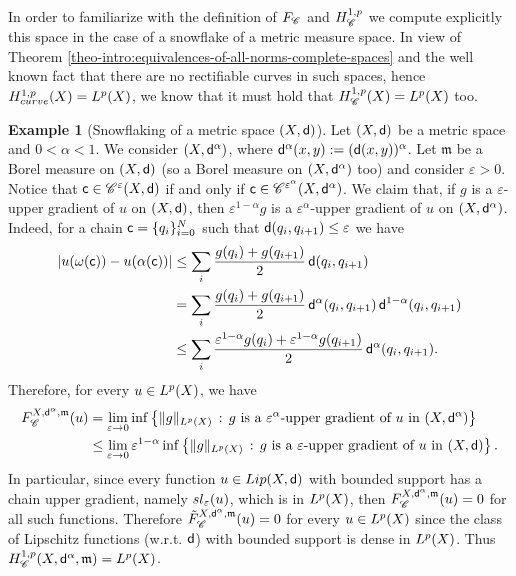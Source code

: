 \documentclass[12pt]{amsart}
\newcommand{\sfd}{{\sf d}}
\newcommand{\X}{{\rm X}}
\newcommand{\Lip}{{\rm Lip}}
\newcommand{\mm}{\mathfrak m}
\newcommand{\F}{{\rm F}}
\theoremstyle{definition}
\newtheorem{example}[theorem]{Example}
\newcommand{\sfc}{{\sf c}}
\newcommand{\Chain}[1]{\mathscr{C}^{#1}}
\renewcommand{\sl}[1]{{\rm sl}_{#1}}
\newcommand{\HH}[2]{H^{1,#1}_{{\rm #2}}}
\renewcommand{\F}[1]{{\rm F}_{{\rm #1}}}
\newcommand{\relF}[1]{\tilde{\rm F}_{{\rm #1}}}
\begin{document}
In order to familiarize with the definition of $\F{\Chain{}}$ and $\HH{p}{\Chain{}}$ we compute explicitly this space in the case of a snowflake of a metric measure space. In view of Theorem \ref{theo-intro:equivalences-of-all-norms-complete-spaces} and the well known fact that there are no rectifiable curves in such spaces, hence $\HH{p}{curve}(\X) = L^p(\X)$, we know that it must hold that $\HH{p}{\Chain{}}(\X) = L^p(\X)$ too.
%
\begin{example}[{Snowflaking of a metric space $(\X,\sfd)$}]
\label{rem:snowflake}
    Let $(\X,\sfd)$ be a metric space and $0<\alpha<1$. We consider $(\X,\sfd^\alpha)$, where $\sfd^\alpha(x,y):=(\sfd(x,y))^\alpha$. Let $\mm$ be a Borel measure on $(\X,\sfd)$ (so a Borel measure on $(\X,\sfd^\alpha)$ too)
    and consider $\varepsilon >0$. Notice that $\sfc \in \Chain{\varepsilon}(\X,\sfd)$ if and only if $\sfc \in \Chain{\varepsilon^\alpha}(\X,\sfd^\alpha)$. 
    We claim that, if $g$ is a $\varepsilon$-upper gradient of $u$ on $(\X,\sfd)$, then $\varepsilon^{1-\alpha} g$ is a $\varepsilon^\alpha$-upper gradient of $u$ on $(\X,\sfd^\alpha)$.
    Indeed, for a chain $\sfc=\{ q_i\}_{i=0}^N$ such that $\sfd(q_i,q_{i+1})\le \varepsilon$ we have 
    \begin{align}
        |u(\omega(\sfc))-u(\alpha(\sfc))| & \le \sum_i \frac{g(q_i) + g(q_{i+1})}{2}\,\sfd(q_i,q_{i+1}) \\
        & = \sum_i \frac{g(q_i) + g(q_{i+1})}{2}\,\sfd^\alpha(q_i,q_{i+1})\,\sfd^{1-\alpha}(q_i,q_{i+1}) \\
        &\le \sum_i \frac{\varepsilon^{1-\alpha}g(q_i) + \varepsilon^{1-\alpha}g(q_{i+1})}{2}\,\sfd^\alpha(q_i,q_{i+1}).
    \end{align}
    Therefore, for every $u\in L^p(\X)$, we have
    \begin{equation}
        \begin{aligned}
            \F{\Chain{}}^{\X,\sfd^\alpha,\mm}(u) &= \lim_{\varepsilon \to 0} \inf\left\{ \Vert g \Vert_{L^p(\X)}\,:\, g \text{ is a } \varepsilon^\alpha\text{-upper gradient of } u  \text{ in } (\X,\sfd^\alpha)  \right\} \\
            &\le \lim_{\varepsilon \to 0} \varepsilon^{1-\alpha}\inf\left\{ \Vert g \Vert_{L^p(\X)}\,:\, g \text{ is a } \varepsilon\text{-upper gradient of } u  \text{ in } (\X,\sfd)  \right\}.
        \end{aligned}
    \end{equation}
    In particular, since every function $u\in \Lip(\X,\sfd)$ with bounded support has a chain upper gradient, namely $\sl{\varepsilon}(u)$, which is in $L^p(\X)$, then $\F{\Chain{}}^{\X,\sfd^\alpha,\mm}(u)= 0$ for all such functions. Therefore $\relF{\Chain{}}^{\X,\sfd^\alpha,\mm}(u) = 0$ for every $u\in L^p(\X)$ since the class of Lipschitz functions (w.r.t. $\sfd$) with bounded support is dense in $L^p(\X)$. Thus $\HH{p}{\Chain{}}(\X,\sfd^\alpha,\mm) = L^p(\X)$.
\end{example}
\end{document}
